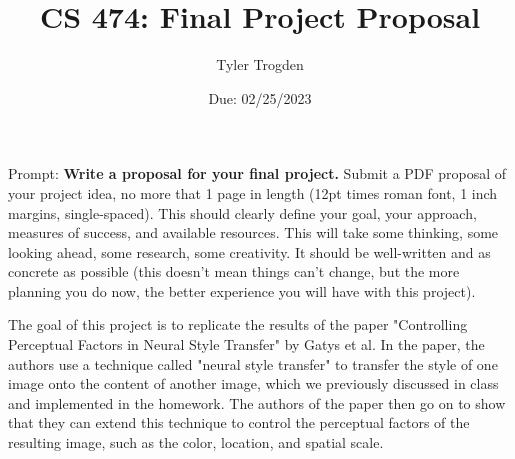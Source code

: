 \documentclass[12pt]{article}
\title{CS 474: Final Project Proposal}
\author{Tyler Trogden}
\date{Due: 02/25/2023}
\begin{document}
\maketitle

    Prompt: \textbf{Write a proposal for your final project.} Submit a PDF proposal of your project idea, no more that 1 page in length (12pt times roman font, 1 inch margins, single-spaced). This should clearly define your goal, your approach, measures of success, and available resources. This will take some thinking, some looking ahead, some research, some creativity. It should be well-written and as concrete as possible (this doesn't mean things can't change, but the more planning you do now, the better experience you will have with this project).

    The goal of this project is to replicate the results of the paper "Controlling Perceptual Factors
    in Neural Style Transfer" by Gatys et al.  In the paper, the authors use a technique called "neural style transfer" 
    to transfer the style of one image onto the content of another image, which we previously discussed in class
    and implemented in the homework. The authors of the paper then go on to show that they can extend this technique
    to control the perceptual factors of the resulting image, such as the color, location, and spatial scale.
\end{document}
